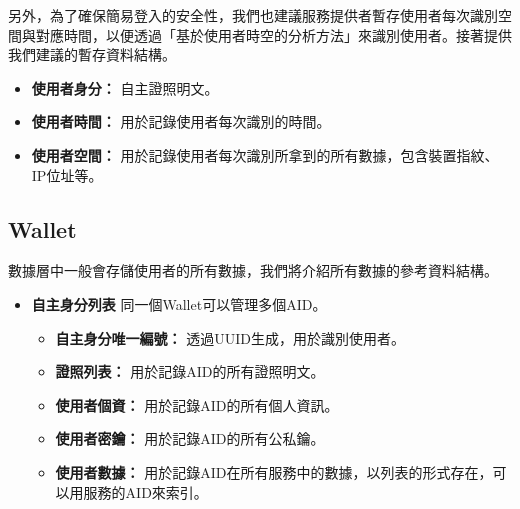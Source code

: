 另外，為了確保簡易登入的安全性，我們也建議服務提供者暫存使用者每次識別空間與對應時間，以便透過「基於使用者時空的分析方法」來識別使用者。接著提供我們建議的暫存資料結構。
\begin{itemize}
  \item \textbf{使用者身分：} 自主證照明文。
  \item \textbf{使用者時間：} 用於記錄使用者每次識別的時間。
  \item \textbf{使用者空間：} 用於記錄使用者每次識別所拿到的所有數據，包含裝置指紋、IP位址等。
\end{itemize}
\subsection{Wallet}
數據層中一般會存儲使用者的所有數據，我們將介紹所有數據的參考資料結構。
\begin{itemize}
  \item \textbf{自主身分列表} 同一個Wallet可以管理多個AID。
        \begin{itemize}
          \item \textbf{自主身分唯一編號：} 透過UUID生成，用於識別使用者。
          \item \textbf{證照列表：} 用於記錄AID的所有證照明文。
          \item \textbf{使用者個資：} 用於記錄AID的所有個人資訊。
          \item \textbf{使用者密鑰：} 用於記錄AID的所有公私鑰。
          \item \textbf{使用者數據：} 用於記錄AID在所有服務中的數據，以列表的形式存在，可以用服務的AID來索引。
        \end{itemize}
\end{itemize}
